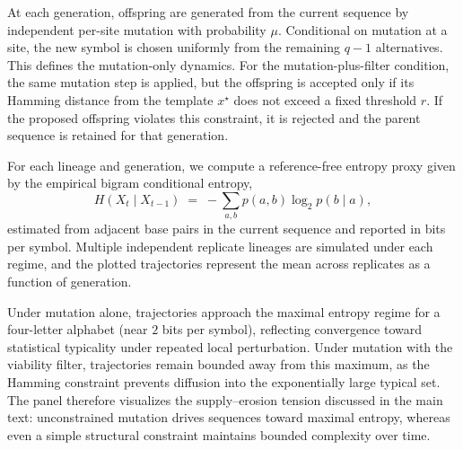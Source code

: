 At each generation, offspring are generated from the current sequence by independent per-site mutation with probability $\mu$. Conditional on mutation at a site, the new symbol is chosen uniformly from the remaining $q-1$ alternatives. This defines the mutation-only dynamics. For the mutation-plus-filter condition, the same mutation step is applied, but the offspring is accepted only if its Hamming distance from the template $x^\star$ does not exceed a fixed threshold $r$. If the proposed offspring violates this constraint, it is rejected and the parent sequence is retained for that generation.

For each lineage and generation, we compute a reference-free entropy proxy given by the empirical bigram conditional entropy,
\[
H(X_t \mid X_{t-1}) \;=\; -\sum_{a,b} p(a,b)\log_2 p(b\mid a),
\]
estimated from adjacent base pairs in the current sequence and reported in bits per symbol. Multiple independent replicate lineages are simulated under each regime, and the plotted trajectories represent the mean across replicates as a function of generation.

Under mutation alone, trajectories approach the maximal entropy regime for a four-letter alphabet (near $2$ bits per symbol), reflecting convergence toward statistical typicality under repeated local perturbation. Under mutation with the viability filter, trajectories remain bounded away from this maximum, as the Hamming constraint prevents diffusion into the exponentially large typical set. The panel therefore visualizes the supply--erosion tension discussed in the main text: unconstrained mutation drives sequences toward maximal entropy, whereas even a simple structural constraint maintains bounded complexity over time.





